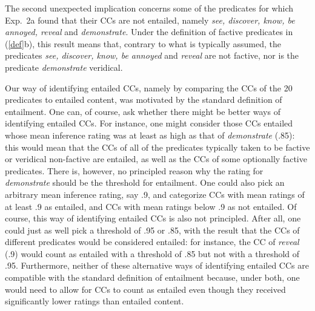\documentclass[11pt,fleqn]{article}
\newcommand{\6}{\mbox{$[\hspace*{-.6mm}[$}}
\newcommand{\9}{\mbox{$]\hspace*{-.6mm}]$}}
\begin{document}
The second unexpected implication concerns some of the predicates for which Exp.~2a found that their CCs are not entailed, namely {\em see, discover, know, be annoyed, reveal} and {\em demonstrate}. Under the definition of factive predicates in (\ref{def}b), this result means that, contrary to what is typically assumed, the predicates {\em see, discover, know, be annoyed} and {\em reveal} are not factive, nor is the predicate {\em demonstrate} veridical.

Our way of identifying entailed CCs, namely by comparing the CCs of the 20 predicates to entailed content, was motivated by the standard definition of entailment. One can, of course, ask whether there might be better ways of identifying entailed CCs. For instance, one might consider those CCs entailed whose mean inference rating was at least as high as that of {\em demonstrate} (.85): this would mean that the CCs of all of the predicates typically taken to be factive or veridical non-factive are entailed, as well as the CCs of some optionally factive predicates. There is, however, no principled reason why the rating for {\em demonstrate} should be the threshold for entailment. One could also pick an arbitrary mean inference rating, say .9, and categorize CCs with mean ratings of at least .9 as entailed, and CCs with mean ratings below .9 as not entailed. Of course, this way of identifying entailed CCs is also not principled. After all, one could just as well pick a threshold of .95 or .85, with the result that the CCs of different predicates would be considered entailed: for instance, the CC of {\em reveal} (.9) would count as entailed with a threshold of .85 but not with a threshold of .95. Furthermore, neither of these alternative ways of identifying entailed CCs are compatible with the standard definition of entailment because, under both, one would need to allow for CCs to count as entailed even though they received significantly lower ratings than entailed content.

\end{document}
